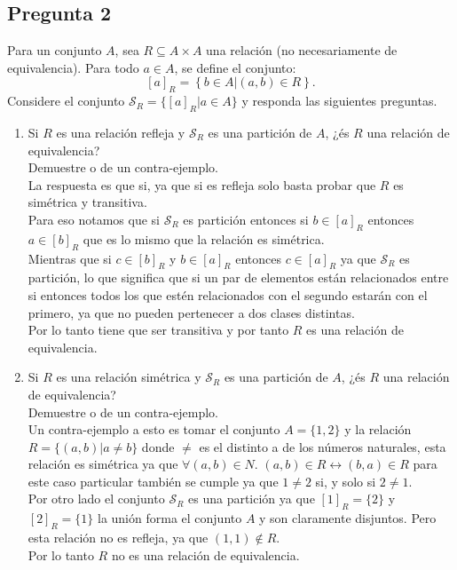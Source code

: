 \documentclass[letter]{article}
\begin{document}
	\begin{pregunta}{2}
		\section*{Pregunta 2}
		Para un conjunto $A$, sea $R\subseteq A\times A$ una relación (no necesariamente de equivalencia). Para todo $a\in A$, se define el conjunto:
		$$ [a]_{R}=\left\lbrace b\in A | (a,b)\in R\right\rbrace.$$
		Considere el conjunto $\mathcal{S}_R=\{[a]_R|a\in A\}$ y responda las siguientes preguntas.
		\begin{enumerate}
		\item Si $R$ es una relación refleja y $\mathcal{S}_R$ es una partición de $A$, ¿és $R$ una relación de equivalencia?\\
		Demuestre o de un contra-ejemplo.\\
		
		La respuesta es que si, ya que si es refleja solo basta probar que $R$ es simétrica y transitiva.\\
		
		Para eso notamos que si $\mathcal{S}_R$ es partición entonces si $b \in [a]_R$ entonces $a \in [b]_R$ que es lo mismo que la relación es simétrica.\\
		
		Mientras que si $c \in [b]_R$ y $b\in [a]_R$ entonces $c\in [a]_R$ ya que $\mathcal{S}_R$ es partición, lo que significa que si un par de elementos están relacionados entre si entonces todos los que estén relacionados con el segundo estarán con el primero, ya que no pueden pertenecer a dos clases distintas.\\
		
		Por lo tanto tiene que ser transitiva y por tanto $R$ es una relación de equivalencia.
		\item Si $R$ es una relación simétrica y $\mathcal{S}_R$ es una partición de $A$, ¿és $R$ una relación de equivalencia?\\
		Demuestre o de un contra-ejemplo.\\
		
		Un contra-ejemplo a esto es tomar el conjunto $A = \{1,2\}$ y la relación $R = \{(a,b)| a\neq b\}$ donde $\neq$ es el distinto a de los números naturales, esta relación es simétrica ya que $\forall (a,b)\in N$.  $(a,b)\in R \leftrightarrow (b,a)\in R$ para este caso particular también se cumple ya que $1 \neq 2$ si, y solo si $2\neq 1$.\\
		
		Por otro lado el conjunto $\mathcal{S}_{R}$ es una partición ya que $[1]_R=\{2\}$ y $[2]_R=\{1\}$ la unión forma el conjunto $A$ y son claramente disjuntos. Pero esta relación no es refleja, ya que $(1,1)\notin R$.\\
		
		Por lo tanto $R$ no es una relación de equivalencia.
		\end{enumerate}
		
	\end{pregunta}
\end{document}

